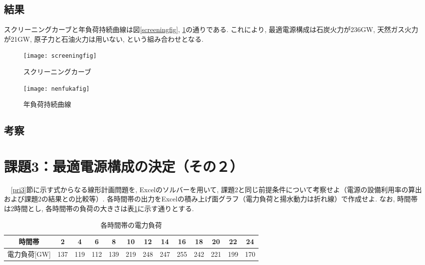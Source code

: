\documentclass[]{jsarticle}
\begin{document}
    \subsection{結果}
        スクリーニングカーブと年負荷持続曲線は図\ref{screeningfig}, \ref{nenfukafig}の通りである. これにより, 最適電源構成は石炭火力が236GW, 天然ガス火力が21GW, 原子力と石油火力は用いない, という組み合わせとなる.

        \begin{figure}[htbp]
          \begin{minipage}{0.5\hsize}
            \begin{center}
              \texttt{[image: screeningfig]}
              \caption{スクリーニングカーブ}
              \label{screeningfig}
            \end{center}
          \end{minipage}
          \begin{minipage}{0.5\hsize}
            \begin{center}
              \texttt{[image: nenfukafig]}
              \caption{年負荷持続曲線}
              \label{nenfukafig}
            \end{center}
          \end{minipage}
        \end{figure}


    \subsection{考察}


\section{課題3：最適電源構成の決定（その２）}
  \begin{screen}
    　\ref{pri3}節に示す式からなる線形計画問題を, Excelのソルバーを用いて, 課題2と同じ前提条件について考察せよ（電源の設備利用率の算出および課題2の結果との比較等）. 各時間帯の出力をExcelの積み上げ面グラフ（電力負荷と揚水動力は折れ線）で作成せよ. なお, 時間帯は2時間とし, 各時間帯の負荷の大きさは表\ref{text_fig2}に示す通りとする.
  \end{screen}

  \begin{table}[htb]
    \begin{center}
      \caption{各時間帯の電力負荷\cite{t}}
      \begin{tabular}{|c|c|c|c|c|c|c|c|c|c|c|c|c|} \hline
        時間帯 & 2 & 4 & 6 & 8 & 10 & 12 & 14 & 16 & 18 & 20 & 22 & 24\\ \hline
        電力負荷[GW] & 137 & 119 & 112 & 139 & 219 & 248 & 247 & 255 & 242 & 221 & 199 & 170 \\ \hline
      \end{tabular}
      \label{text_fig2}
    \end{center}
  \end{table}
\end{document}

